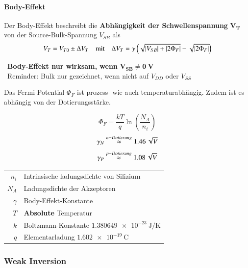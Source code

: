 \paragraph{Body-Effekt}
Der Body-Effekt beschreibt die \textbf{Abhängigkeit der Schwellenspannung} $\bm{V_T}$ von der Source-Bulk-Spannung $V_{SB}$ als
\[ 
    V_T = V_{T0} \pm \Delta V_T 
    \quad \text{mit} \quad 
    \Delta V_T = \gamma\left(\sqrt{\left|V_{SB}\right| + \left|2\Phi_F\right|}-\sqrt{\left|2\Phi_F\right|}\right)
\]

\rightarrow\ \textbf{Body-Effekt nur wirksam, wenn} $\mathbf{V_{SB} \neq \qty{0}{\volt}}$ \\
\rightarrow\ Reminder: Bulk nur gezeichnet, wenn nicht auf $V_{DD}$ oder $V_{SS}$

\medskip

Das Fermi-Potential $\Phi_F$ ist prozess- wie auch temperaturabhängig. Zudem ist es abhängig von der Dotierungsstärke.

\begin{minipage}[c]{0.3\columnwidth}
    \[ \Phi_F = \frac{kT}{q} \ln \left( \frac{N_A}{n_i} \right) \]
    \[ \gamma_N \overset{n-Dotierung}{\approx} \qty{1.46}{\sqrt{\volt}} \]
    \[ \gamma_P \overset{p-Dotierung}{\approx} \qty{1.08}{\sqrt{\volt}} \]
\end{minipage}
\hfill
\begin{minipage}[c]{0.68\columnwidth}
    \begin{tabular}{rl}
        $n_i$       & Intrinsische ladungsdichte von Silizium   \\
        $N_A$       & Ladungsdichte der Akzeptoren              \\
        $\gamma$    & Body-Effekt-Konstante                     \\
        $T$         & \textbf{Absolute} Temperatur              \\
        $k$         & Boltzmann-Konstante $\qty{1.380649 e-23}{\joule\per\kelvin}$  \\
        $q$         & Elementarladung $\qty{1.602 e-19}{\coulomb}$
    \end{tabular}
\end{minipage}


\subsubsection{Weak Inversion}

\vspace{-0.3cm}

